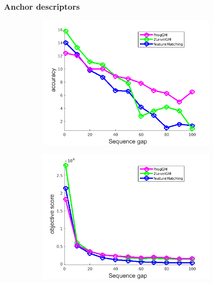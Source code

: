 \documentclass[
	fontsize=12pt,
	paper=a4,
	twoside=false,
	numbers=noenddot,
	plainheadsepline,
	toc=listof,
	toc=bibliography
]{scrartcl}
\begin{document}
\subsubsection{Anchor descriptors}
\vspace{-20pt}
\begin{figure}[h] 
	\begin{subfigure}[b]{0.3\textwidth}
		\centering
		\includegraphics[scale=0.25]{"fig_ver2608/RealImages/HouseSeq/anchor_descr/using_cpd_afftrafo/solution/performance/accuracy"}  
	\end{subfigure}%
	\begin{subfigure}[b]{0.3\textwidth}
		\centering
		\includegraphics[scale=0.25]{"fig_ver2608/RealImages/HouseSeq/anchor_descr/using_cpd_afftrafo/solution/performance/score"}  

\end{subfigure}
\end{figure}
\end{document}

